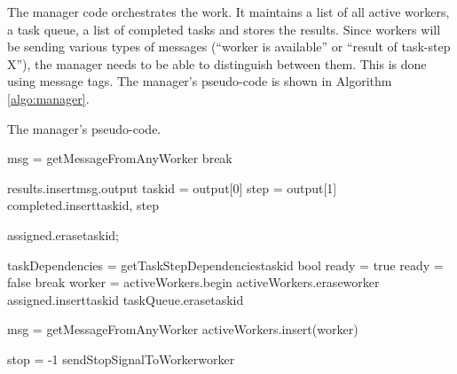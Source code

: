 \documentclass[a4paper,oneside,12pt]{article}
\begin{document}
The manager code orchestrates the work. It maintains a list of all active workers, a task queue, a list of completed tasks and stores the results. 
Since workers will be sending various types of messages (``worker is available'' or ``result of task-step X''), the manager needs to be able to 
distinguish between them. This is done using message tags.
The manager's pseudo-code is shown in Algorithm \ref{algo:manager}.

\begin{algorithm}
\caption{The manager's pseudo-code.}
    \begin{algorithmic}[1] %



            \State msg = getMessageFromAnyWorker{}
              \State break
            \EndIf

            \State results.insert{msg.output}
            \State taskid = output[0]
            \State step = output[1]
            completed.insert{taskid, step}

                assigned.erase{taskid};
            \EndIf
        \EndWhile

            \State taskDependencies = getTaskStepDependencies{taskid}
            \State bool ready = true
                    \State ready = false
                    \State break
                \EndIf
            \EndFor
                \State worker = activeWorkers.begin{}
                \State activeWorkers.erase{worker}
                \State {}
                \State assigned.insert{taskid}
                \State taskQueue.erase{taskid}
            \EndIf
        \EndFor

            \State msg = getMessageFromAnyWorker{}
                \State activeWorkers.insert(worker)
            \EndIf
        \EndFor

    \EndWhile

    \State stop = -1
        \Call sendStopSignalToWorker{worker}
    \EndFor

\end{algorithmic}
\label{algo:manager}
\end{algorithm}
\end{document}
